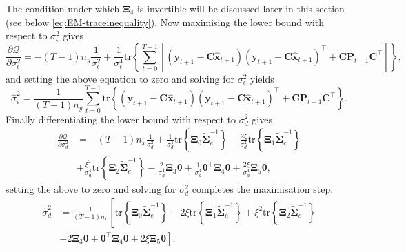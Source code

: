 \documentclass[]{article}
\begin{document}
The condition under which $\boldsymbol\Xi_4$ is invertible will be discussed later in this section (see below \eqref{eq:EM-traceinequality}). Now maximising the lower bound with respect to $\sigma_{\epsilon}^2$ gives
\begin{equation}
  \frac{\partial \mathcal Q}{\partial \sigma_{\epsilon}^2}=-(T-1)n_y\frac{1}{\sigma_{\epsilon}^2}+\frac{1}{\sigma_{\epsilon}^4}\mathrm{tr}\left\lbrace\sum_{t=0}^{T-1}\left[ (\mathbf y_{t+1}-\mathbf C\mathbf{\hat{x}}_{t+1}) (\mathbf y_{t+1}-\mathbf C\mathbf{\hat{x}}_{t+1})^\top+\mathbf C \mathbf P_{t+1}\mathbf C^\top\right] \right\rbrace,
\end{equation}
and setting the above equation to zero and solving for $\sigma_{\epsilon}^2$ yields
\begin{equation}\label{eq:sigmaepsilonhat}
 \hat{\sigma}_{\epsilon}^2=\frac{1}{(T-1)n_y}\sum_{t=0}^{T-1}\mathrm{tr}\left\lbrace (\mathbf y_{t+1}-\mathbf C\mathbf{\hat{x}}_{t+1}) (\mathbf y_{t+1}-\mathbf C\mathbf{\hat{x}}_{t+1})^\top+\mathbf C \mathbf P_{t+1}\mathbf C^\top \right\rbrace.
\end{equation}
Finally differentiating the lower bound with respect to $\sigma_d^2$ gives
\begin{align}
 \frac{\partial \mathcal Q}{\partial \sigma_d^2}&= -(T-1)n_x\frac{1}{\sigma_d^2}+\frac{1}{\sigma_d^4}\mathrm{tr}\left\lbrace \boldsymbol\Xi_0 \tilde{\boldsymbol\Sigma}_e^{-1}\right\rbrace-\frac{2\xi}{\sigma_d^4} \mathrm{tr}\left\lbrace \boldsymbol\Xi_1 \tilde{\boldsymbol\Sigma}_e^{-1}\right\rbrace  \nonumber \\
&+\frac{\xi^2}{\sigma_d^4}\mathrm{tr} \left\lbrace\boldsymbol\Xi_2\tilde{\boldsymbol\Sigma}_e^{-1} \right\rbrace-\frac{2}{\sigma_d^4}\boldsymbol\Xi_3\boldsymbol\theta +\frac{1}{\sigma_d^4}\boldsymbol\theta^\top \boldsymbol\Xi_4\boldsymbol\theta+\frac{2\xi}{\sigma_d^4} \boldsymbol\Xi_5 \boldsymbol\theta,
\end{align}
setting the above to zero and solving for $\sigma_d^2$ completes the maximisation step.
\begin{align}\label{eq:sigmadhat}
\hat{\sigma}_d^2&=\frac{1}{(T-1)n_x}\left[ \mathrm{tr}\left\lbrace \boldsymbol\Xi_0 \tilde{\boldsymbol\Sigma}_e^{-1}\right\rbrace-
2\xi\mathrm{tr}\left\lbrace \boldsymbol\Xi_1 \tilde{\boldsymbol\Sigma}_e^{-1}\right\rbrace +\xi^2\mathrm{tr} \left\lbrace\boldsymbol\Xi_2\tilde{\boldsymbol\Sigma}_e^{-1}\right\rbrace\right.\nonumber \\ &\left.-2\boldsymbol\Xi_3\boldsymbol\theta+\boldsymbol\theta^\top\boldsymbol \Xi_4\boldsymbol\theta+2\xi\boldsymbol\Xi_5 \boldsymbol\theta\right].
\end{align}
\end{document}
